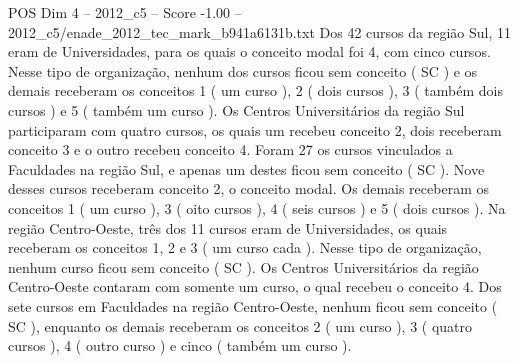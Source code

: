\begin{textsample}{POS Dim 4 – 2012\_c5 – Score -1.00 – 2012\_c5/enade\_2012\_tec\_mark\_b941a6131b.txt}
Dos 42 cursos da região Sul, 11 eram de Universidades, para os quais o conceito modal foi 4, com cinco cursos.
Nesse tipo de organização, nenhum dos cursos ficou sem conceito ( SC ) e os demais receberam os conceitos 1 ( um curso ), 2 ( dois cursos ), 3 ( também dois cursos ) e 5 ( também um curso ).
Os Centros Universitários da região Sul participaram com quatro cursos, os quais um recebeu conceito 2, dois receberam conceito 3 e o outro recebeu conceito 4.
Foram 27 os cursos vinculados a Faculdades na região Sul, e apenas um destes ficou sem conceito ( SC ).
Nove desses cursos receberam conceito 2, o conceito modal.
Os demais receberam os conceitos 1 ( um curso ), 3 ( oito cursos ), 4 ( seis cursos ) e 5 ( dois cursos ).
Na região Centro-Oeste, três dos 11 cursos eram de Universidades, os quais receberam os conceitos 1, 2 e 3 ( um curso cada ).
Nesse tipo de organização, nenhum curso ficou sem conceito ( SC ).
Os Centros Universitários da região Centro-Oeste contaram com somente um curso, o qual recebeu o conceito 4.
Dos sete cursos em Faculdades na região Centro-Oeste, nenhum ficou sem conceito ( SC ), enquanto os demais receberam os conceitos 2 ( um curso ), 3 ( quatro cursos ), 4 ( outro curso ) e cinco ( também um curso ).

\end{textsample}
